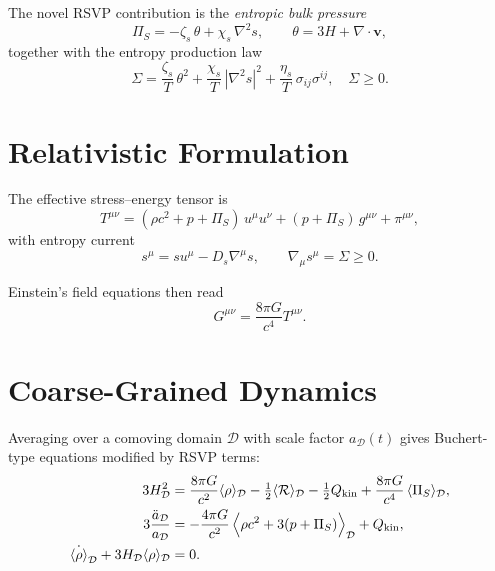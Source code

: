 \documentclass[12pt]{book}
\begin{document}
The novel RSVP contribution is the \emph{entropic bulk pressure}
\begin{equation}
\Pi_S = - \zeta_s \,\theta + \chi_s \,\nabla^2 s, \qquad 
\theta = 3H + \nabla \cdot \mathbf{v},
\end{equation}
together with the entropy production law
\begin{equation}
\Sigma = \frac{\zeta_s}{T}\,\theta^2
+ \frac{\chi_s}{T}\,|\nabla^2 s|^2
+ \frac{\eta_s}{T}\,\sigma_{ij}\sigma^{ij}, \quad \Sigma \ge 0.
\end{equation}

\section{Relativistic Formulation}

The effective stress--energy tensor is
\begin{equation}
T^{\mu\nu} = (\rho c^2 + p + \Pi_S)\,u^\mu u^\nu
+ (p + \Pi_S)\,g^{\mu\nu} + \pi^{\mu\nu},
\end{equation}
with entropy current
\begin{equation}
s^\mu = s u^\mu - D_s \nabla^\mu s, \qquad 
\nabla_\mu s^\mu = \Sigma \ge 0.
\end{equation}

Einstein’s field equations then read
\begin{equation}
G^{\mu\nu} = \frac{8\pi G}{c^4} T^{\mu\nu}.
\end{equation}

\section{Coarse-Grained Dynamics}

Averaging over a comoving domain $\mathcal{D}$ with scale factor
$a_\mathcal{D}(t)$ gives Buchert-type equations modified by RSVP terms:
\begin{align}
3 H_\mathcal{D}^2 &=
\frac{8\pi G}{c^2} \langle \rho \rangle_\mathcal{D}
- \tfrac{1}{2} \langle \mathcal{R} \rangle_\mathcal{D}
- \tfrac{1}{2} Q_{\rm kin}
+ \frac{8\pi G}{c^4}\,\langle \Pi_S \rangle_\mathcal{D}, \\
3 \frac{\ddot{a}_\mathcal{D}}{a_\mathcal{D}} &=
-\frac{4\pi G}{c^2}\,\Big\langle \rho c^2 + 3(p+\Pi_S)\Big\rangle_\mathcal{D}
+ Q_{\rm kin}, \\
\dot{\langle \rho \rangle}_\mathcal{D} + 3H_\mathcal{D}\langle \rho \rangle_\mathcal{D} &= 0.
\end{align}
\end{document}
